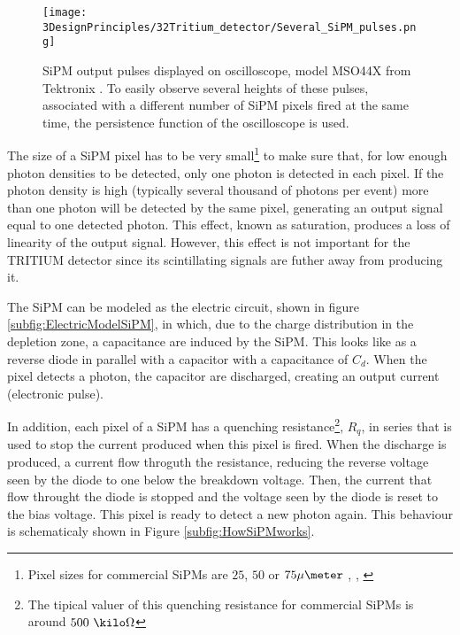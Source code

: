 \begin{figure}[htbp]
\centering
\texttt{[image: 3DesignPrinciples/32Tritium\_detector/Several\_SiPM\_pulses.png]}
\caption{SiPM output pulses displayed on oscilloscope, model MSO44X from Tektronix \cite{Oscilloscope}. To easily observe several heights of these pulses, associated with a different number of  SiPM pixels fired at the same time, the persistence function of the oscilloscope is used.\label{fig:PulsesOfSiPM}}
\end{figure}

The size of a SiPM pixel has to be very small\footnote{Pixel sizes for commercial SiPMs are $25$, $50$ or $75\mu\meter$ \cite{DataSheetHammamatsu_1_SiPM_25}, \cite{DataSheetHammamatsu_1_SiPM_50}, \cite{DataSheetHammamatsu_1_SiPM_75}} to make sure that, for low enough photon densities to be detected, only one photon is detected in each pixel. If the photon density is high (typically several thousand of photons per event) more than one photon will be detected by the same pixel, generating an output signal equal to one detected photon. This effect, known as saturation, produces a loss of linearity of the output signal. However, this effect is not important for the TRITIUM detector since its scintillating signals are futher away from producing it. %

The SiPM can be modeled as the electric circuit, shown in figure \ref{subfig:ElectricModelSiPM}, in which, due to the charge distribution in the depletion zone, a capacitance are induced by the SiPM. This looks like as a reverse diode in parallel with a capacitor with a capacitance of $C_d$. When the pixel detects a photon, the capacitor are discharged, creating an output current (electronic pulse).

In addition, each pixel of a SiPM has a quenching resistance\footnote{The tipical valuer of this quenching resistance for commercial SiPMs is around $500~\kilo\Omega$}, $R_q$, in series that is used to stop the current produced when this pixel is fired. When the discharge is produced, a current flow throguth the resistance, reducing the reverse voltage seen by the diode to one below the breakdown voltage. Then, the current that flow throught the diode is stopped and the voltage seen by the diode is reset to the bias voltage. This pixel is ready to detect a new photon again. This behaviour is schematicaly shown in Figure \ref{subfig:HowSiPMworks}.

